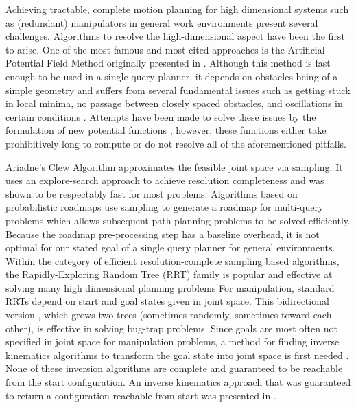 \documentclass[conference]{IEEEtran}
\begin{document}
Achieving tractable, complete motion planning for high dimensional 
systems such as (redundant) manipulators in general work environments
present several challenges. Algorithms to resolve the high-dimensional aspect 
have been the first to arise.  One of the most famous and most cited
approaches is the Artificial Potential Field Method originally presented in
\cite{khatib86}. Although this method is fast enough to be used in a single
query planner, it depends on obstacles being of a simple geometry and
suffers from several fundamental issues such as getting stuck in local
minima, no passage between closely spaced obstacles, and oscillations in
certain conditions \cite{koren91}.  Attempts have been made to solve these
issues by the formulation of new potential functions \cite{connolly90,ge00},
however, these functions either take prohibitively long to compute or do not
resolve all of the aforementioned pitfalls. 

Ariadne's Clew Algorithm \cite{bessiere93} approximates the feasible 
joint space via sampling. It uses an explore-search approach to achieve
resolution completeness and was shown to be respectably fast for most problems.
Algorithms based on probabilistic roadmaps \cite{amato96} use sampling 
to generate a roadmap for multi-query problems which allows subsequent
path planning problems to be solved efficiently.  Because the roadmap 
pre-processing step has a baseline overhead, it is not optimal for our stated 
goal of a single query planner for general environments.  Within the
category of efficient resolution-complete sampling based algorithms, the
Rapidly-Exploring Random Tree (RRT) family is popular and effective at solving 
many high dimensional planning problems \cite{lavalle98,lavalle00} 
For manipulation, standard RRTs depend on start and goal states given in joint 
space.  This bidirectional version \cite{lavalle00}, which grows two trees 
(sometimes randomly, sometimes toward each other), is effective in solving 
bug-trap problems. 
Since goals are most often not specified in joint space for manipulation
problems, a method for finding inverse kinematics algorithms to transform
the goal state into joint space is first needed
\cite{chang87,goldenberg85,guez88,parker89}. 
None of these inversion algorithms are complete and guaranteed to be
reachable from the start configuration. An inverse kinematics approach that
was guaranteed to return a configuration reachable from start was presented
in \cite{ahuactzin99}. 
\end{document}
